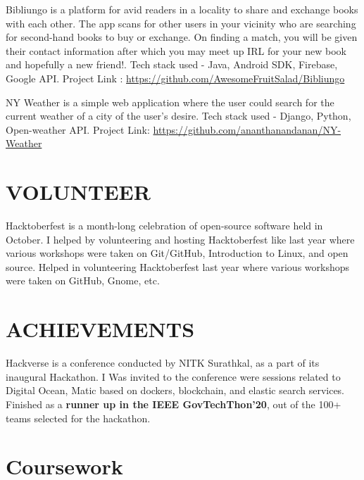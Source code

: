 \documentclass[11pt,a4paper,sans]{moderncv}        %
\begin{document}
{Bibliungo is a platform for avid readers in a locality to share and exchange books with each other. The app scans for other users in your vicinity who are searching for second-hand books to buy or exchange. On finding a match, you will be given their contact information after which you may meet up IRL for your new book and hopefully a new friend!. Tech stack used - Java, Android SDK, Firebase, Google API.
Project Link : {\newline}
\url{https://github.com/AwesomeFruitSalad/Bibliungo}}


{NY Weather is a simple web application where the user could search for the current weather of a city of the user's desire. Tech stack used - Django, Python, Open-weather API. Project Link: {\newline}
\url{https://github.com/ananthanandanan/NY-Weather}}{}



\section{VOLUNTEER}
{Hacktoberfest is a month-long celebration of open-source software held in  October. I helped by volunteering and hosting Hacktoberfest like last year where various workshops were taken on Git/GitHub, Introduction to Linux, and open source.}
{Helped in volunteering  Hacktoberfest last year where various workshops were taken on GitHub, Gnome, etc. }


\section{ACHIEVEMENTS}
{Hackverse is a conference conducted by NITK Surathkal, as a part of its inaugural Hackathon. I Was invited to the conference were sessions related to Digital Ocean,  Matic based on dockers, blockchain, and elastic search services. }
{Finished as a \textbf{runner up in the IEEE GovTechThon'20}, out of the 100+ teams selected for the hackathon. }



\section{Coursework}
\end{document}
